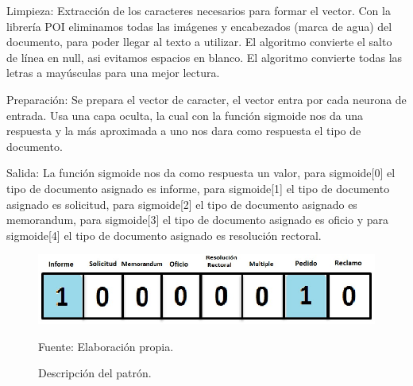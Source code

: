 Limpieza:
Extracción de los caracteres necesarios para formar el vector.
Con la librería POI eliminamos todas las imágenes y encabezados (marca de agua) del documento, para poder llegar al texto a utilizar.
El algoritmo convierte el salto de línea en null, asi evitamos espacios en blanco.
El algoritmo convierte todas las letras a mayúsculas para una mejor lectura.

Preparación:
Se prepara el vector de caracter, el vector entra por cada neurona de entrada.
Usa una capa oculta, la cual con la función sigmoide nos da una respuesta y la más aproximada a uno nos dara como respuesta el tipo de documento.

Salida:
La función sigmoide nos da como respuesta un valor, para sigmoide[0] el tipo de documento asignado es informe, para sigmoide[1] el tipo de documento asignado es solicitud, para sigmoide[2] el tipo de documento asignado es memorandum, para sigmoide[3] el tipo de documento asignado es oficio y para sigmoide[4] el tipo de documento asignado es resolución rectoral.

\begin{figure}[h!]
	\centering
		\includegraphics[scale=0.4]{imagenes/DescriPatron.png}
		\caption{Descripción del patrón.}
	\begin{center}
    Fuente: Elaboración propia.
    \end{center}
	\label{fig:DescriPatron}
\end{figure}
